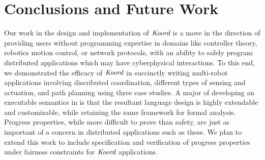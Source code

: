\section{Conclusions and Future Work}
\label{sec:conclusion}

Our work in the design and implementation of $\emph{Koord}$ is a move in the direction of providing users without programming expertise in domains like controller theory, robotics motion control, or network protocols, with an ability to safely program distributed applications which may have cyberphysical interactions. To this end, we demonstrated the efficacy of $\emph{Koord}$ in succinctly writing multi-robot applications involving discributed coordination, different types of sensing and actuation, and path planning using three case studies.
       A major of developing an executable semantics in \K is that the resultant language design is highly extendable and customizable, while retaining the same framework for formal analysis. Progress properties, while more difficult to prove than safety, are just as important of a concern in distributed applications such as these. We plan to extend this work to include specification and verification of progress properties under fairness constraints for $\emph{Koord}$ applications.